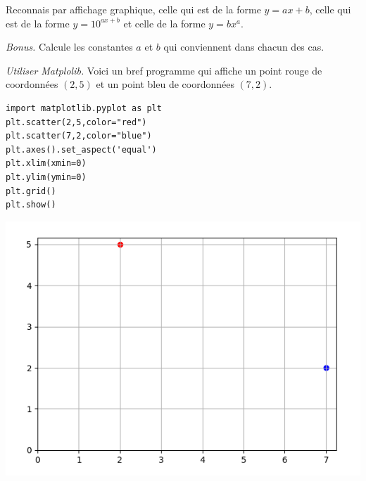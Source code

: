 \documentclass[11pt,class=report,crop=false]{standalone}
\begin{document}
\begin{activite}
\begin{enumerate}
    \medskip
    
    Reconnais par affichage graphique, celle qui est de la forme $y=ax+b$,
    celle qui est de la forme $y = 10^{ax+b}$ et celle de la forme $y = b x^a$.
    
    \emph{Bonus.} Calcule les constantes $a$ et $b$ qui conviennent dans chacun des cas.
   
    
  \end{enumerate}


\emph{Utiliser Matplolib.} Voici un bref programme qui affiche un point rouge de coordonnées $(2,5)$ et un point bleu de coordonnées $(7,2)$. 

\begin{minipage}{0.45\textwidth}
\begin{lstlisting}
import matplotlib.pyplot as plt
plt.scatter(2,5,color="red")
plt.scatter(7,2,color="blue")
plt.axes().set_aspect('equal')
plt.xlim(xmin=0)
plt.ylim(ymin=0)
plt.grid()
plt.show()
\end{lstlisting}
\end{minipage}\quad
\begin{minipage}{0.5\textwidth}
\includegraphics[scale=\myscale,scale=0.4]{ecran_logarithme_1}
\end{minipage}
\end{activite}



\end{document}
